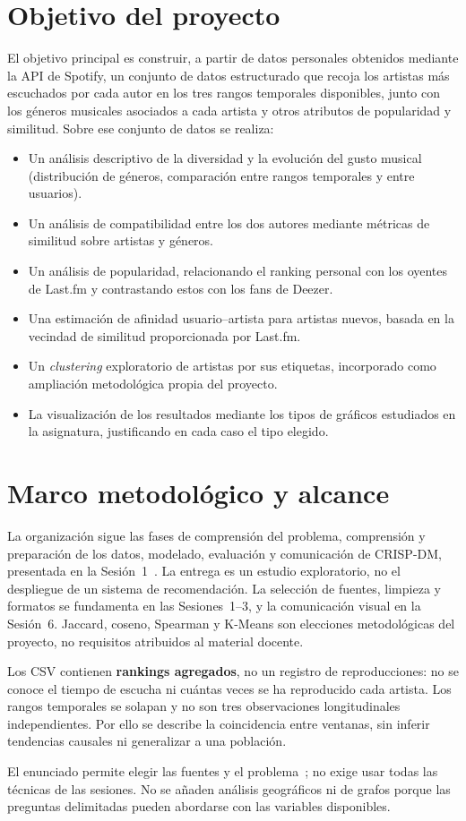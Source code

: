 \section{Objetivo del proyecto}
\label{sec:objetivo}

El objetivo principal es construir, a partir de datos personales obtenidos mediante la API de Spotify, un conjunto de datos estructurado que recoja los artistas más escuchados por cada autor en los tres rangos temporales disponibles, junto con los géneros musicales asociados a cada artista y otros atributos de popularidad y similitud. Sobre ese conjunto de datos se realiza:

\begin{itemize}
    \item Un análisis descriptivo de la diversidad y la evolución del gusto musical (distribución de géneros, comparación entre rangos temporales y entre usuarios).
    \item Un análisis de compatibilidad entre los dos autores mediante métricas de similitud sobre artistas y géneros.
    \item Un análisis de popularidad, relacionando el ranking personal con los oyentes de Last.fm y contrastando estos con los fans de Deezer.
    \item Una estimación de afinidad usuario--artista para artistas nuevos, basada en la vecindad de similitud proporcionada por Last.fm.
    \item Un \emph{clustering} exploratorio de artistas por sus etiquetas, incorporado como ampliación metodológica propia del proyecto.
    \item La visualización de los resultados mediante los tipos de gráficos estudiados en la asignatura, justificando en cada caso el tipo elegido.
\end{itemize}

\section{Marco metodológico y alcance}

La organización sigue las fases de comprensión del problema, comprensión y preparación de los datos, modelado, evaluación y comunicación de CRISP-DM, presentada en la Sesión~1~\cite{sesion1}. La entrega es un estudio exploratorio, no el despliegue de un sistema de recomendación. La selección de fuentes, limpieza y formatos se fundamenta en las Sesiones~1--3, y la comunicación visual en la Sesión~6. Jaccard, coseno, Spearman y K-Means son elecciones metodológicas del proyecto, no requisitos atribuidos al material docente.

Los CSV contienen \textbf{rankings agregados}, no un registro de reproducciones: no se conoce el tiempo de escucha ni cuántas veces se ha reproducido cada artista. Los rangos temporales se solapan y no son tres observaciones longitudinales independientes. Por ello se describe la coincidencia entre ventanas, sin inferir tendencias causales ni generalizar a una población.

El enunciado permite elegir las fuentes y el problema~\cite{enunciado}; no exige usar todas las técnicas de las sesiones. No se añaden análisis geográficos ni de grafos porque las preguntas delimitadas pueden abordarse con las variables disponibles.
